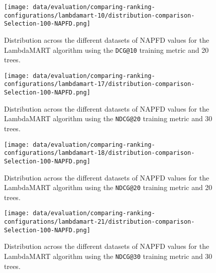 \begin{figure}
    \centering
    \begin{minipage}{.45\textwidth}
        \centering
        \label{fig:lambdamart-10-napfd}
        \texttt{[image: data/evaluation/comparing-ranking-configurations/lambdamart-10/distribution-comparison-Selection-100-NAPFD.png]}
        \parbox{0.9\textwidth}{\caption{Distribution across the different datasets of NAPFD values for the LambdaMART algorithm using the \texttt{DCG@10} training metric and 20 trees.}}
    \end{minipage}%
    \begin{minipage}{.45\textwidth}
        \centering
        \label{fig:lambdamart-17-napfd}
        \texttt{[image: data/evaluation/comparing-ranking-configurations/lambdamart-17/distribution-comparison-Selection-100-NAPFD.png]}
        \parbox{0.9\textwidth}{\caption{Distribution across the different datasets of NAPFD values for the LambdaMART algorithm using the \texttt{NDCG@20} training metric and 30 trees.}}
    \end{minipage}%
\end{figure}

\begin{figure}
    \centering
    \begin{minipage}{.45\textwidth}
        \centering
        \label{fig:lambdamart-18-napfd}
        \texttt{[image: data/evaluation/comparing-ranking-configurations/lambdamart-18/distribution-comparison-Selection-100-NAPFD.png]}
        \parbox{0.9\textwidth}{\caption{Distribution across the different datasets of NAPFD values for the LambdaMART algorithm using the \texttt{NDCG@20} training metric and 20 trees.}}
    \end{minipage}%
    \begin{minipage}{.45\textwidth}
        \centering
        \label{fig:lambdamart-21-napfd}
        \texttt{[image: data/evaluation/comparing-ranking-configurations/lambdamart-21/distribution-comparison-Selection-100-NAPFD.png]}
        \parbox{0.9\textwidth}{\caption{Distribution across the different datasets of NAPFD values for the LambdaMART algorithm using the \texttt{NDCG@30} training metric and 30 trees.}}
    \end{minipage}%
\end{figure}

